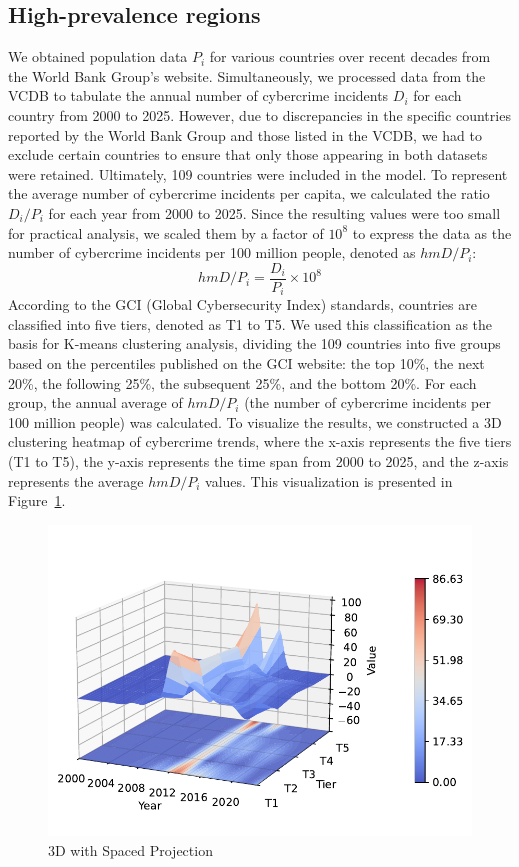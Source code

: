 \subsection{High-prevalence regions}\label{subsec:high-prevalence-regions} %
	We obtained population data $P_i$ for various countries over recent decades from the World Bank Group's website\cite{population}.
	Simultaneously, we processed data from the VCDB to tabulate the annual number of cybercrime incidents $D_i$ for each country from 2000 to 2025.
	However, due to discrepancies in the specific countries reported by the World Bank Group and those listed in the VCDB,
	we had to exclude certain countries to ensure that only those appearing in both datasets were retained.
	Ultimately, 109 countries were included in the model.
	To represent the average number of cybercrime incidents per capita,
	we calculated the ratio $D_i/P_i$ for each year from 2000 to 2025.
	Since the resulting values were too small for practical analysis,
	we scaled them by a factor of $10^{8}$ to express the data as the number of cybercrime incidents per 100 million people,
	denoted as $hmD/P_i$:
	\begin{equation}
		hmD/P_i = \frac{D_i}{P_i} \times 10^{8}\label{eq:3-2}
	\end{equation}
	According to the GCI (Global Cybersecurity Index) standards, countries are classified into five tiers, denoted as T1 to T5.
	We used this classification as the basis for K-means clustering analysis,
	dividing the 109 countries into five groups based on the percentiles published on the GCI website:
	the top 10\%, the next 20\%, the following 25\%, the subsequent 25\%, and the bottom 20\%.
	For each group, the annual average of $hmD/P_i$ (the number of cybercrime incidents per 100 million people) was calculated.
	To visualize the results, we constructed a 3D clustering heatmap of cybercrime trends,
	where the x-axis represents the five tiers (T1 to T5),
	the y-axis represents the time span from 2000 to 2025,
	and the z-axis represents the average $hmD/P_i$ values.
	This visualization is presented in Figure~\ref{fig:3D_with_Spaced_Projection}.
	\begin{figure}[htb]
		\centering
		\includegraphics[width=0.75\linewidth]{../rsrc/distributions/3D_with_Spaced_Projection}
		\caption{3D with Spaced Projection}\label{fig:3D_with_Spaced_Projection}
	\end{figure}

